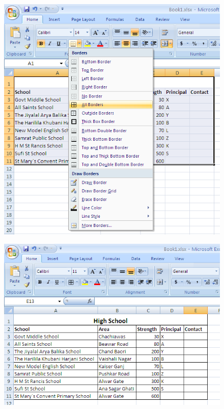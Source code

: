 \begin{figure}[H]
\centering
\includegraphics[scale=.7]{src/images/chapter2/chapter2_fig08.png}
\end{figure}
\newpage

\begin{figure}[H]
\centering
\includegraphics[scale=.6]{src/images/chapter2/chapter2_fig09.png}
\end{figure}

